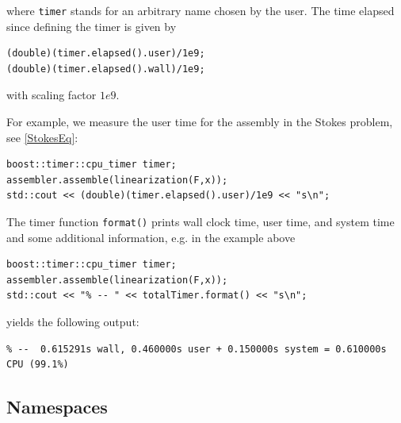 \documentclass[11pt]{article}
\begin{document}
\noindent where {\tt timer} stands for an arbitrary name chosen by the user.
The time elapsed since defining the timer is given by 
\begin{lstlisting}
(double)(timer.elapsed().user)/1e9;
(double)(timer.elapsed().wall)/1e9;
\end{lstlisting}

\noindent with scaling factor $1e9$.

For example, we measure the user time for the assembly in the Stokes problem,
see \ref{StokesEq}:

\begin{lstlisting}
boost::timer::cpu_timer timer;
assembler.assemble(linearization(F,x));
std::cout << (double)(timer.elapsed().user)/1e9 << "s\n";
\end{lstlisting}

The timer function {\tt format()} prints wall clock time, user time, and
system time and some additional information, e.g. in the example above

\begin{lstlisting}
boost::timer::cpu_timer timer;
assembler.assemble(linearization(F,x));
std::cout << "% -- " << totalTimer.format() << "s\n";
\end{lstlisting}

\noindent yields the following output:

\begin{scriptsize}
\begin{verbatim}
% --  0.615291s wall, 0.460000s user + 0.150000s system = 0.610000s CPU (99.1%)
\end{verbatim}
\end{scriptsize}




\subsection{Namespaces}\label{namespaces}
\end{document}
